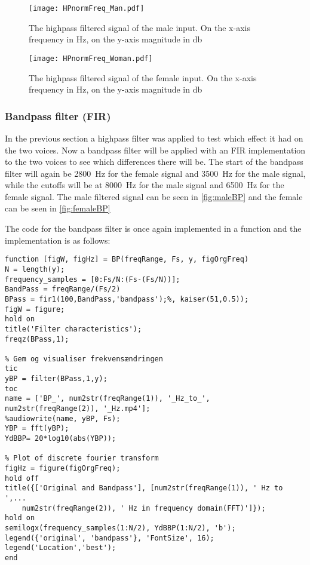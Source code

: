 \begin{figure}[h]
	\centering
	\texttt{[image: HPnormFreq\_Man.pdf]}
	\caption{The highpass filtered signal of the male input. On the x-axis frequency in \si{\hertz}, on the y-axis magnitude in \si{\decibel}}
	\label{fig:HPMAle}
\end{figure}

\begin{figure}[h]
	\centering
	\texttt{[image: HPnormFreq\_Woman.pdf]}
	\caption{The highpass filtered signal of the female input. On the x-axis frequency in \si{\hertz}, on the y-axis magnitude in \si{\decibel}}
	\label{fig:HPFemale}
\end{figure}

\clearpage

\subsubsection{Bandpass filter (FIR)}
\label{sec:Bandpass}
In the previous section a highpass filter was applied to test which effect it had on the two voices. Now a bandpass filter will be applied with an FIR implementation to the two voices to see which differences there will be. The start of the bandpass filter will again be \SI{2800}{\hertz} for the female signal and \SI{3500}{\hertz} for the male signal, while the cutoffs will be at \SI{8000}{\hertz} for the male signal and \SI{6500}{\hertz} for the female signal. The male filtered signal can be seen in \cref{fig:maleBP} and the female can be seen in \cref{fig:femaleBP}

The code for the bandpass filter is once again implemented in a function and the implementation is as follows:

\begin{verbatim}
function [figW, figHz] = BP(freqRange, Fs, y, figOrgFreq)
N = length(y);
frequency_samples = [0:Fs/N:(Fs-(Fs/N))];
BandPass = freqRange/(Fs/2)
BPass = fir1(100,BandPass,'bandpass');%, kaiser(51,0.5));
figW = figure;
hold on
title('Filter characteristics');
freqz(BPass,1);

% Gem og visualiser frekvensændringen
tic
yBP = filter(BPass,1,y);
toc
name = ['BP_', num2str(freqRange(1)), '_Hz_to_', num2str(freqRange(2)), '_Hz.mp4'];
%audiowrite(name, yBP, Fs);
YBP = fft(yBP);
YdBBP= 20*log10(abs(YBP));

% Plot of discrete fourier transform
figHz = figure(figOrgFreq);
hold off
title({['Original and Bandpass'], [num2str(freqRange(1)), ' Hz to ',...
	num2str(freqRange(2)), ' Hz in frequency domain(FFT)']});
hold on
semilogx(frequency_samples(1:N/2), YdBBP(1:N/2), 'b');
legend({'original', 'bandpass'}, 'FontSize', 16);
legend('Location','best');
end
\end{verbatim}

